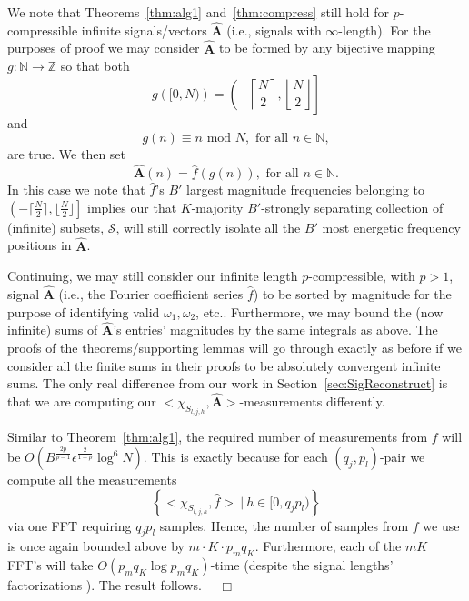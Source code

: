 \documentclass{article}
\begin{document}
We note that Theorems~\ref{thm:alg1} and~\ref{thm:compress} still hold for $p$-compressible infinite signals/vectors $\hat{\textbf{A}}$ (i.e., signals with $\infty$-length).  For the purposes of proof we may consider $\hat{\textbf{A}}$ to be formed by any bijective mapping $g: \mathbb{N} \rightarrow \mathbb{Z}$ so that both
$$g \left( [0,N) \right) = \left( - \left\lceil \frac{N}{2} \right\rceil, \left\lfloor \frac{N}{2} \right\rfloor \right]$$
and
$$g(n) \equiv n \textrm{ mod } N, \textrm{ for all } n \in \mathbb{N},$$
are true.  We then set
$$\hat{\textbf{A}}(n) = \hat{f} \left( g(n) \right), \textrm{ for all } n \in \mathbb{N}.$$
In this case we note that $\hat{f}$'s $B'$ largest magnitude frequencies belonging to $\left( - \big\lceil \frac{N}{2} \big\rceil, \big\lfloor \frac{N}{2} \big\rfloor \right]$ implies our that $K$-majority $B'$-strongly separating collection of (infinite) subsets, $\mathcal{S}$, will still correctly isolate all the $B'$ most energetic frequency positions in $\hat{\textbf{A}}$.

Continuing, we may still consider our infinite length $p$-compressible, with $p > 1$, signal $\hat{\textbf{A}}$ (i.e., the Fourier coefficient series $\hat{f}$) to be sorted by magnitude for the purpose of identifying valid $\omega_{1}, \omega_{2}$, etc.. Furthermore, we may bound the (now infinite) sums of $\hat{\textbf{A}}$'s entries' magnitudes by the same integrals as above.  The proofs of the theorems/supporting lemmas will go through exactly as before if we consider all the finite sums in their proofs to be absolutely convergent infinite sums.  The only real difference from our work in Section~\ref{sec:SigReconstruct} is that we are computing our $<\chi_{S_{l,j,h}},\hat{\textbf{A}}>$-measurements differently.

Similar to Theorem~\ref{thm:alg1}, the required number of measurements from $f$ will be $O \left( B^{\frac{2p}{p-1}} \epsilon^{\frac{2}{1-p}} \log^{6} N \right)$.  This is exactly because for each $(q_{j}, p_{l})$-pair we compute all the measurements $$\left\{ <\chi_{S_{l,j,h}}, \hat{f}> ~\big|~ h \in [0, q_{j}p_{l}) \right\}$$
via one FFT requiring $q_{j}p_{l}$ samples.  Hence, the number of samples from $f$ we use is once again bounded above by $m \cdot K \cdot p_{m}q_{K}$.  Furthermore, each of the $m K$ FFT's will take $O( p_{m}q_{K} \log p_{m}q_{K} )$-time (despite the signal lengths' factorizations \cite{1968-bluestein,rabiner-schafer-rader}).  The result follows.
~~$\Box$ \\
\end{document}
